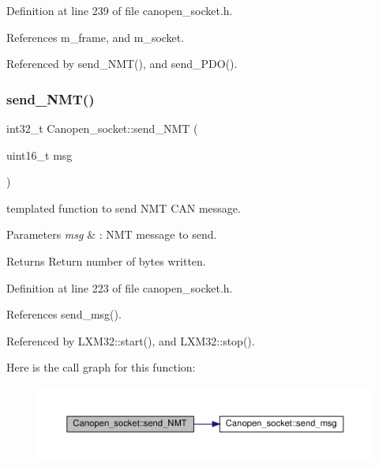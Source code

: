 Definition at line 239 of file canopen\+\_\+socket.\+h.



References m\+\_\+frame, and m\+\_\+socket.



Referenced by send\+\_\+\+N\+M\+T(), and send\+\_\+\+P\+D\+O().

\mbox{\label{class_canopen__socket_a835dea5a2888f8e689e587651e5f4edd}} 
\subsubsection{\texorpdfstring{send\+\_\+\+N\+M\+T()}{send\_NMT()}}
{\footnotesize\ttfamily int32\+\_\+t Canopen\+\_\+socket\+::send\+\_\+\+N\+MT (\begin{DoxyParamCaption}\item[{uint16\+\_\+t}]{msg }\end{DoxyParamCaption})\hspace{0.3cm}{\ttfamily [inline]}}



templated function to send N\+MT C\+AN message. 


\begin{DoxyParams}{Parameters}
{\em msg} & \+: N\+MT message to send. \\
\hline
\end{DoxyParams}
\begin{DoxyReturn}{Returns}
Return number of bytes written. 
\end{DoxyReturn}


Definition at line 223 of file canopen\+\_\+socket.\+h.



References send\+\_\+msg().



Referenced by L\+X\+M32\+::start(), and L\+X\+M32\+::stop().

Here is the call graph for this function\+:\nopagebreak
\begin{figure}[H]
\begin{center}
\leavevmode
\includegraphics[width=350pt]{class_canopen__socket_a835dea5a2888f8e689e587651e5f4edd_cgraph}
\end{center}
\end{figure}
\mbox{\label{class_canopen__socket_a7450dea468619c57c7a3eda7c69bcafa}} 
